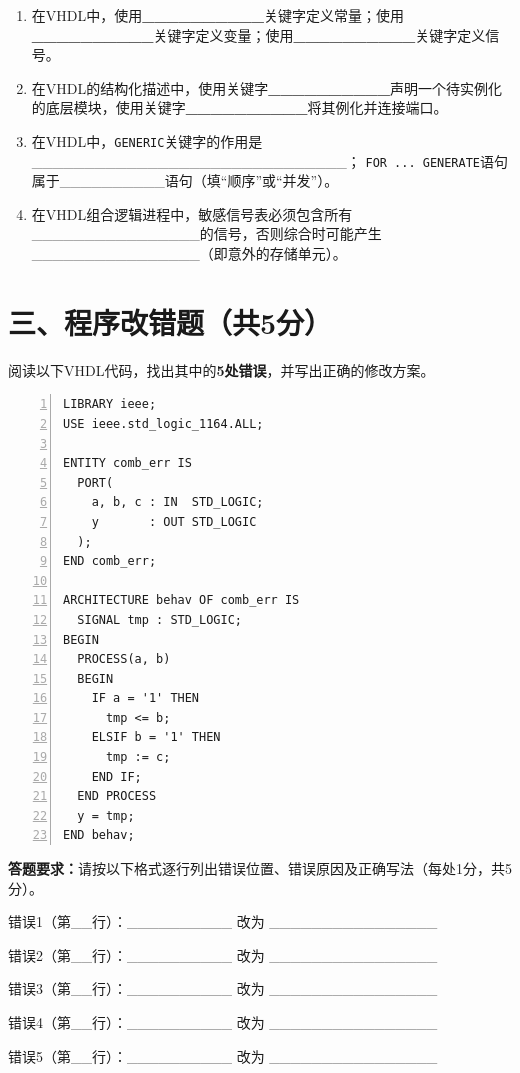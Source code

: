 \begin{enumerate}[label=\arabic*.]

\item 在VHDL中，使用\textbf{\_\_\_\_\_\_\_\_\_\_}关键字定义常量；使用\textbf{\_\_\_\_\_\_\_\_\_\_}关键字定义变量；使用\textbf{\_\_\_\_\_\_\_\_\_\_}关键字定义信号。

\item 在VHDL的结构化描述中，使用关键字\textbf{\_\_\_\_\_\_\_\_\_\_}声明一个待实例化的底层模块，使用关键字\textbf{\_\_\_\_\_\_\_\_\_\_}将其例化并连接端口。

\item 在VHDL中，\texttt{GENERIC}关键字的作用是\_\_\_\_\_\_\_\_\_\_\_\_\_\_\_\_\_\_\_\_\_\_\_\_\_\_\_\_\_\_；
\texttt{FOR ... GENERATE}语句属于\_\_\_\_\_\_\_\_\_\_语句（填“顺序”或“并发”）。

\item 在VHDL组合逻辑进程中，敏感信号表必须包含所有\_\_\_\_\_\_\_\_\_\_\_\_\_\_\_\_的信号，否则综合时可能产生\_\_\_\_\_\_\_\_\_\_\_\_\_\_\_\_（即意外的存储单元）。

\end{enumerate}

\newpage

\section*{三、程序改错题（共5分）}

阅读以下VHDL代码，找出其中的\textbf{5处错误}，并写出正确的修改方案。

\begin{lstlisting}[caption={存在错误的VHDL代码（描述一个组合逻辑电路）}, numbers=left]
LIBRARY ieee;
USE ieee.std_logic_1164.ALL;

ENTITY comb_err IS
  PORT(
    a, b, c : IN  STD_LOGIC;
    y       : OUT STD_LOGIC
  );
END comb_err;

ARCHITECTURE behav OF comb_err IS
  SIGNAL tmp : STD_LOGIC;
BEGIN
  PROCESS(a, b)
  BEGIN
    IF a = '1' THEN
      tmp <= b;
    ELSIF b = '1' THEN
      tmp := c;
    END IF;
  END PROCESS
  y = tmp;
END behav;
\end{lstlisting}

\begin{framed}
\textbf{答题要求：}请按以下格式逐行列出错误位置、错误原因及正确写法（每处1分，共5分）。\par
错误1（第\_\_行）：\_\_\_\_\_\_\_\_\_\_ 改为 \_\_\_\_\_\_\_\_\_\_\_\_\_\_\_\_\par
错误2（第\_\_行）：\_\_\_\_\_\_\_\_\_\_ 改为 \_\_\_\_\_\_\_\_\_\_\_\_\_\_\_\_\par
错误3（第\_\_行）：\_\_\_\_\_\_\_\_\_\_ 改为 \_\_\_\_\_\_\_\_\_\_\_\_\_\_\_\_\par
错误4（第\_\_行）：\_\_\_\_\_\_\_\_\_\_ 改为 \_\_\_\_\_\_\_\_\_\_\_\_\_\_\_\_\par
错误5（第\_\_行）：\_\_\_\_\_\_\_\_\_\_ 改为 \_\_\_\_\_\_\_\_\_\_\_\_\_\_\_\_
\end{framed}

